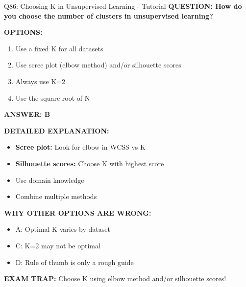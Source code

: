 \documentclass[8pt]{beamer}
\begin{document}
	\begin{frame}{Q86: Choosing K in Unsupervised Learning - Tutorial}
		\fontsize{6.5}{7.5}\selectfont
		\textbf{QUESTION: How do you choose the number of clusters in unsupervised learning?}
		
		\vspace{0.1cm}
		\textbf{OPTIONS:}
		\begin{enumerate}
			\item Use a fixed K for all datasets
			\item Use scree plot (elbow method) and/or silhouette scores
			\item Always use K=2
			\item Use the square root of N
		\end{enumerate}
		
		\vspace{0.1cm}
		\textcolor{myblue}{\textbf{ANSWER: B}}
		
		\vspace{0.1cm}
		\textbf{DETAILED EXPLANATION:}
		\begin{itemize}
			\item \textbf{Scree plot:} Look for elbow in WCSS vs K
			\item \textbf{Silhouette scores:} Choose K with highest score
			\item Use domain knowledge
			\item Combine multiple methods
		\end{itemize}
		
		\vspace{0.1cm}
		\textcolor{myred}{\textbf{WHY OTHER OPTIONS ARE WRONG:}}
		\begin{itemize}
			\item \textcolor{myred}{A:} Optimal K varies by dataset
			\item \textcolor{myred}{C:} K=2 may not be optimal
			\item \textcolor{myred}{D:} Rule of thumb is only a rough guide
		\end{itemize}
		
		\textcolor{myred}{\textbf{EXAM TRAP:}} Choose K using \textcolor{myblue}{elbow method and/or silhouette scores}!
	\end{frame}
	
\end{document}
